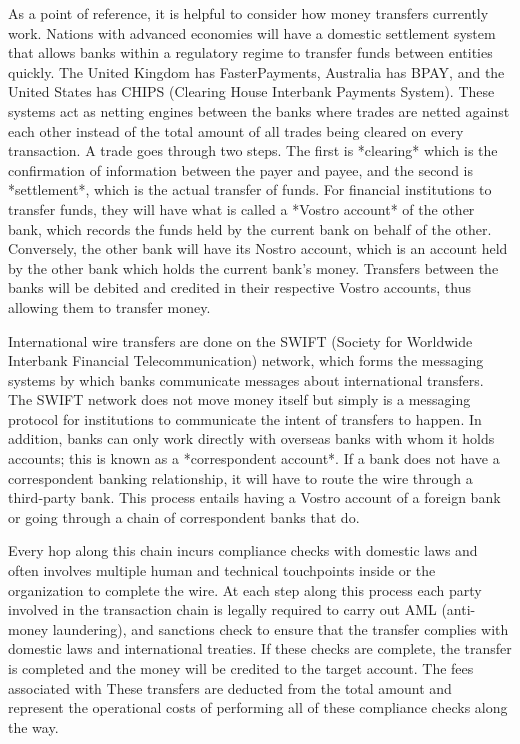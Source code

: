 As a point of reference, it is helpful to consider how money transfers currently
work. Nations with advanced economies will have a domestic settlement system
that allows banks within a regulatory regime to transfer funds between entities
quickly. The United Kingdom has FasterPayments, Australia has BPAY, and the
United States has CHIPS (Clearing House Interbank Payments System). These
systems act as netting engines between the banks where trades are netted against
each other instead of the total amount of all trades being cleared on every
transaction. A trade goes through two steps. The first is *clearing* which is
the confirmation of information between the payer and payee, and the second is
*settlement*, which is the actual transfer of funds. For financial institutions
to transfer funds, they will have what is called a *Vostro account* of the other
bank, which records the funds held by the current bank on behalf of the other.
Conversely, the other bank will have its Nostro account, which is an account
held by the other bank which holds the current bank's money. Transfers between
the banks will be debited and credited in their respective Vostro accounts, thus
allowing them to transfer money.


International wire transfers are done on the SWIFT (Society for Worldwide
Interbank Financial Telecommunication) network, which forms the messaging
systems by which banks communicate messages about international transfers. The
SWIFT network does not move money itself but simply is a messaging protocol for
institutions to communicate the intent of transfers to happen. In addition,
banks can only work directly with overseas banks with whom it holds accounts;
this is known as a *correspondent account*. If a bank does not have a
correspondent banking relationship, it will have to route the wire through a
third-party bank. This process entails having a Vostro account of a foreign bank
or going through a chain of correspondent banks that do.


Every hop along this chain incurs compliance checks with domestic laws and often
involves multiple human and technical touchpoints inside or the organization to
complete the wire. At each step along this process each party involved in the
transaction chain is legally required to carry out AML (anti-money laundering),
and sanctions check to ensure that the transfer complies with domestic laws and
international treaties. If these checks are complete, the transfer is completed
and the money will be credited to the target account. The fees associated with
These transfers are deducted from the total amount and represent the operational
costs of performing all of these compliance checks along the way.

